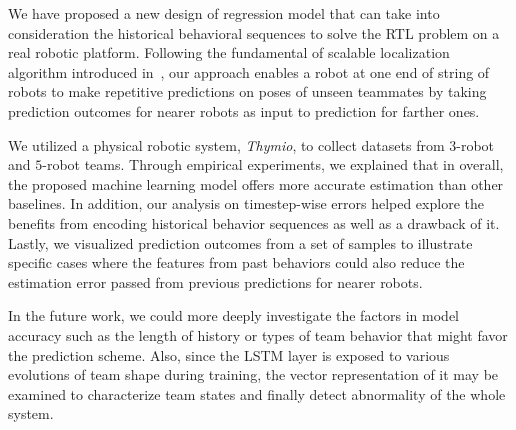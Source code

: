 \documentclass[letterpaper, 10 pt, conference]{ieeeconf}  %
\begin{document}
    We have proposed a new design of regression model that can take into
    consideration the historical behavioral sequences to solve the RTL
    problem on a real robotic platform. Following the fundamental of
    scalable localization algorithm introduced in~\cite{CPR17}, our
    approach enables a robot at one end of string of robots to make
    repetitive predictions on poses of unseen teammates by taking
    prediction outcomes for nearer robots as input to prediction for
    farther ones.

    We utilized a physical robotic system, \emph{Thymio}, to collect
    datasets from $3$-robot and $5$-robot teams. Through empirical
    experiments, we explained that in overall, the proposed machine
    learning model offers more accurate estimation than other baselines.
    In addition, our analysis on timestep-wise errors helped explore the
    benefits from encoding historical behavior sequences as well as a
    drawback of it. Lastly, we visualized prediction outcomes from a set
    of samples to illustrate specific cases where the features from past
    behaviors could also reduce the estimation error passed from
    previous predictions for nearer robots.

    In the future work, we could more deeply investigate the factors in
    model accuracy such as the length of history or types of team
    behavior that might favor the prediction scheme. Also, since the
    LSTM layer is exposed to various evolutions of team shape during
    training, the vector representation of it may be examined to
    characterize team states and finally detect abnormality of the whole
    system.

{\small
	
	
}
\end{document}

